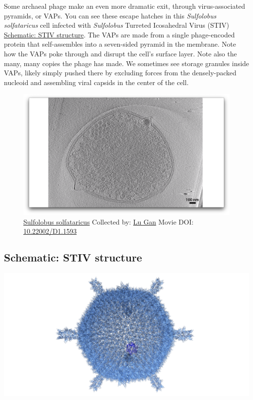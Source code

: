 \documentclass[]{tufte-book}
\begin{document}
Some archaeal phage make an even more dramatic exit, through
virus-associated pyramids, or VAPs. You can see these escape hatches in
this \emph{Sulfolobus solfataricus} cell infected with \emph{Sulfolobus}
Turreted Icosahedral Virus (STIV)
\protect\hyperlink{STIV_structure}{Schematic: STIV structure}. The VAPs
are made from a single phage-encoded protein that self-assembles into a
seven-sided pyramid in the membrane. Note how the VAPs poke through and
disrupt the cell's surface layer. Note also the many, many copies the
phage has made. We sometimes see storage granules inside VAPs, likely
simply pushed there by excluding forces from the densely-packed nucleoid
and assembling viral capsids in the center of the cell.





\begin{figure}
\includegraphics{movie_stills/10_8} \caption[\protect\hyperlink{tree}{Sulfolobus solfataricus} Collected
by: \protect\hyperlink{lu_gan}{Lu Gan} Movie DOI:
\href{https://doi.org/10.22002/D1.1593}{10.22002/D1.1593}]{\protect\hyperlink{tree}{Sulfolobus solfataricus} Collected
by: \protect\hyperlink{lu_gan}{Lu Gan} Movie DOI:
\href{https://doi.org/10.22002/D1.1593}{10.22002/D1.1593}}\label{fig:10-8}
\end{figure}

\hypertarget{STIV_structure}{\subsection*{Schematic: STIV
structure}\label{STIV_structure}}

\includegraphics{img/schematics/10_8_1}
\end{document}
